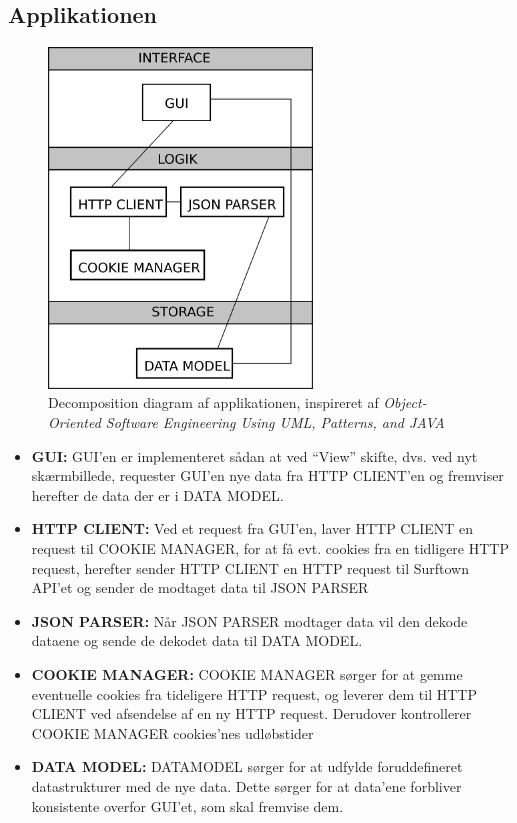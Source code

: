 \documentclass[12pt]{article}
\begin{document}
\subsection{Applikationen}
\begin{figure}[h]
	\centering
	\includegraphics[width=7cm]{system_components.png}
	\caption{Decomposition diagram af applikationen, inspireret af \emph{Object-Oriented Software Engineering Using UML, Patterns, and JAVA}\cite{OOSE}}
	\label{system_components}
\end{figure}
\begin{itemize}
	\item{\textbf{GUI: } GUI'en er implementeret sådan at ved ``View'' skifte, dvs. ved nyt skærmbillede, requester GUI'en nye data fra  HTTP CLIENT'en og fremviser herefter de data der er i DATA MODEL.}	
	\item{\textbf{HTTP CLIENT: } Ved et request fra GUI'en, laver HTTP CLIENT en request til COOKIE MANAGER, for at få evt. cookies fra en tidligere HTTP request, herefter sender HTTP CLIENT en HTTP request til Surftown API'et og sender de modtaget data til JSON PARSER}	
	\item{\textbf{JSON PARSER: }Når JSON PARSER modtager data vil den dekode dataene og sende de dekodet data til DATA MODEL.}
	\item{\textbf{COOKIE MANAGER: }COOKIE MANAGER sørger for at gemme eventuelle cookies fra tideligere HTTP request, og leverer dem til HTTP CLIENT ved afsendelse af en ny HTTP request. Derudover kontrollerer COOKIE MANAGER cookies'nes udløbstider}
	\item{\textbf{DATA MODEL: }DATAMODEL sørger for at udfylde foruddefineret datastrukturer med de nye data. Dette sørger for at data'ene forbliver konsistente overfor GUI'et, som skal fremvise dem.}
\end{itemize}
\end{document}
